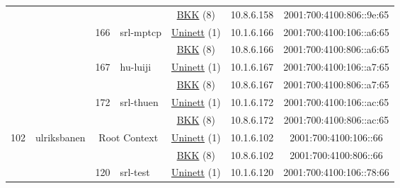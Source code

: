 \begin{small}
\begin{center}
\begin{longtable}{|c|c|c|c|c|c|c|c|}
  &  &  &  & \multicolumn{2}{|c|}{\tiny{\href{http://bkk.no}{BKK} (8)}} & \tiny{10.8.6.158} & \tiny{2001:700:4100:806::9e:65} \\* \cline{3-3}\cline{4-4}\cline{5-5}\cline{6-6}\cline{7-7}\cline{8-8}
  &  & \multirow{2}{*}{\tiny{166}} & \multicolumn{1}{|l|}{\multirow{2}{*}{\tiny{srl-mptcp}}} & \multicolumn{2}{|c|}{\tiny{\href{https://www.uninett.no}{Uninett} (1)}} & \tiny{10.1.6.166} & \tiny{2001:700:4100:106::a6:65} \\* \cline{5-5}\cline{6-6}\cline{7-7}\cline{8-8}
  &  &  &  & \multicolumn{2}{|c|}{\tiny{\href{http://bkk.no}{BKK} (8)}} & \tiny{10.8.6.166} & \tiny{2001:700:4100:806::a6:65} \\* \cline{3-3}\cline{4-4}\cline{5-5}\cline{6-6}\cline{7-7}\cline{8-8}
  &  & \multirow{2}{*}{\tiny{167}} & \multicolumn{1}{|l|}{\multirow{2}{*}{\tiny{hu-luiji}}} & \multicolumn{2}{|c|}{\tiny{\href{https://www.uninett.no}{Uninett} (1)}} & \tiny{10.1.6.167} & \tiny{2001:700:4100:106::a7:65} \\* \cline{5-5}\cline{6-6}\cline{7-7}\cline{8-8}
  &  &  &  & \multicolumn{2}{|c|}{\tiny{\href{http://bkk.no}{BKK} (8)}} & \tiny{10.8.6.167} & \tiny{2001:700:4100:806::a7:65} \\* \cline{3-3}\cline{4-4}\cline{5-5}\cline{6-6}\cline{7-7}\cline{8-8}
  &  & \multirow{2}{*}{\tiny{172}} & \multicolumn{1}{|l|}{\multirow{2}{*}{\tiny{srl-thuen}}} & \multicolumn{2}{|c|}{\tiny{\href{https://www.uninett.no}{Uninett} (1)}} & \tiny{10.1.6.172} & \tiny{2001:700:4100:106::ac:65} \\* \cline{5-5}\cline{6-6}\cline{7-7}\cline{8-8}
  &  &  &  & \multicolumn{2}{|c|}{\tiny{\href{http://bkk.no}{BKK} (8)}} & \tiny{10.8.6.172} & \tiny{2001:700:4100:806::ac:65} \\ \hline
 \multirow{16}{*}{\tiny{102}} & \multicolumn{1}{|l|}{\multirow{16}{*}{\tiny{ulriksbanen}}} & \multicolumn{2}{|c|}{\multirow{2}{*}{\tiny{Root Context}}} & \multicolumn{2}{|c|}{\tiny{\href{https://www.uninett.no}{Uninett} (1)}} & \tiny{10.1.6.102} & \tiny{2001:700:4100:106::66} \\* \cline{5-5}\cline{6-6}\cline{7-7}\cline{8-8}
  &  & \multicolumn{2}{|c|}{} & \multicolumn{2}{|c|}{\tiny{\href{http://bkk.no}{BKK} (8)}} & \tiny{10.8.6.102} & \tiny{2001:700:4100:806::66} \\* \cline{3-3}\cline{4-4}\cline{5-5}\cline{6-6}\cline{7-7}\cline{8-8}
  &  & \multirow{2}{*}{\tiny{120}} & \multicolumn{1}{|l|}{\multirow{2}{*}{\tiny{srl-test}}} & \multicolumn{2}{|c|}{\tiny{\href{https://www.uninett.no}{Uninett} (1)}} & \tiny{10.1.6.120} & \tiny{2001:700:4100:106::78:66} \\* \cline{5-5}\cline{6-6}\cline{7-7}\cline{8-8}

\end{longtable}
\end{center}
\end{small}
